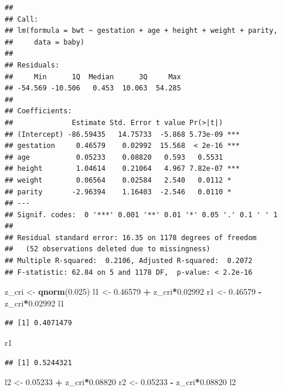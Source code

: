 \documentclass[]{article}
\newenvironment{Shaded}{\begin{snugshade}}{\end{snugshade}}
\newcommand{\FloatTok}[1]{\textcolor[rgb]{0.00,0.00,0.81}{#1}}
\newcommand{\KeywordTok}[1]{\textcolor[rgb]{0.13,0.29,0.53}{\textbf{#1}}}
\newcommand{\NormalTok}[1]{#1}
\newcommand{\OperatorTok}[1]{\textcolor[rgb]{0.81,0.36,0.00}{\textbf{#1}}}
\newcommand{\StringTok}[1]{\textcolor[rgb]{0.31,0.60,0.02}{#1}}
\begin{document}
\begin{verbatim}
## 
## Call:
## lm(formula = bwt ~ gestation + age + height + weight + parity, 
##     data = baby)
## 
## Residuals:
##     Min      1Q  Median      3Q     Max 
## -54.569 -10.506   0.453  10.063  54.285 
## 
## Coefficients:
##              Estimate Std. Error t value Pr(>|t|)    
## (Intercept) -86.59435   14.75733  -5.868 5.73e-09 ***
## gestation     0.46579    0.02992  15.568  < 2e-16 ***
## age           0.05233    0.08820   0.593   0.5531    
## height        1.04614    0.21064   4.967 7.82e-07 ***
## weight        0.06564    0.02584   2.540   0.0112 *  
## parity       -2.96394    1.16403  -2.546   0.0110 *  
## ---
## Signif. codes:  0 '***' 0.001 '**' 0.01 '*' 0.05 '.' 0.1 ' ' 1
## 
## Residual standard error: 16.35 on 1178 degrees of freedom
##   (52 observations deleted due to missingness)
## Multiple R-squared:  0.2106, Adjusted R-squared:  0.2072 
## F-statistic: 62.84 on 5 and 1178 DF,  p-value: < 2.2e-16
\end{verbatim}

\begin{Shaded}
\begin{Highlighting}[]
\NormalTok{z_cri <-}\StringTok{ }\KeywordTok{qnorm}\NormalTok{(}\FloatTok{0.025}\NormalTok{)}
\NormalTok{l1 <-}\StringTok{ }\FloatTok{0.46579} \OperatorTok{+}\StringTok{ }\NormalTok{z_cri}\OperatorTok{*}\FloatTok{0.02992}
\NormalTok{r1 <-}\StringTok{ }\FloatTok{0.46579} \OperatorTok{-}\StringTok{ }\NormalTok{z_cri}\OperatorTok{*}\FloatTok{0.02992}
\NormalTok{l1}
\end{Highlighting}
\end{Shaded}

\begin{verbatim}
## [1] 0.4071479
\end{verbatim}

\begin{Shaded}
\begin{Highlighting}[]
\NormalTok{r1}
\end{Highlighting}
\end{Shaded}

\begin{verbatim}
## [1] 0.5244321
\end{verbatim}

\begin{Shaded}
\begin{Highlighting}[]
\NormalTok{l2 <-}\StringTok{ }\FloatTok{0.05233} \OperatorTok{+}\StringTok{ }\NormalTok{z_cri}\OperatorTok{*}\FloatTok{0.08820}
\NormalTok{r2 <-}\StringTok{ }\FloatTok{0.05233} \OperatorTok{-}\StringTok{ }\NormalTok{z_cri}\OperatorTok{*}\FloatTok{0.08820}
\NormalTok{l2}
\end{Highlighting}
\end{Shaded}
\end{document}
